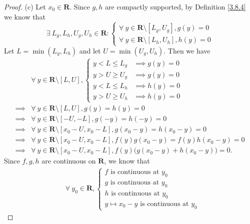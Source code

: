 \begin{proof}{(c)}
    Let \(x_0 \in \mathbf{R}\).
    Since \(g, h\) are compactly supported, by Definition \ref{3.8.4} we know that
    \[
        \exists\ L_g, L_h, U_g, U_h \in \mathbf{R} : \begin{cases}
            \forall\ y \in \mathbf{R} \setminus [L_g, U_g], g(y) = 0 \\
            \forall\ y \in \mathbf{R} \setminus [L_h, U_h], h(y) = 0
        \end{cases}
    \]
    Let \(L = \min(L_g, L_h)\) and let \(U = \min(U_g, U_h)\).
    Then we have
    \begin{align*}
                 & \forall\ y \in \mathbf{R} \setminus [L, U], \begin{cases}
            y < L \leq L_g & \implies g(y) = 0 \\
            y > U \geq U_g & \implies g(y) = 0 \\
            y < L \leq L_h & \implies h(y) = 0 \\
            y > U \geq U_h & \implies h(y) = 0
        \end{cases}                              \\
        \implies & \forall\ y \in \mathbf{R} \setminus [L, U], g(y) = h(y) = 0                                         \\
        \implies & \forall\ y \in \mathbf{R} \setminus [-U, -L], g(-y) = h(-y) = 0                                     \\
        \implies & \forall\ y \in \mathbf{R} \setminus [x_0 - U, x_0 - L], g(x_0 - y) = h(x_0 - y) = 0                 \\
        \implies & \forall\ y \in \mathbf{R} \setminus [x_0 - U, x_0 - L], f(y) g(x_0 - y) = f(y) h(x_0 - y) = 0       \\
        \implies & \forall\ y \in \mathbf{R} \setminus [x_0 - U, x_0 - L], f(y) \big(g(x_0 - y) + h(x_0 - y)\big) = 0.
    \end{align*}
    Since \(f, g, h\) are continuous on \(\mathbf{R}\), we know that
    \begin{align*}
                 & \forall\ y_0 \in \mathbf{R}, \begin{cases}
            f \text{ is continuous at } y_0 \\
            g \text{ is continuous at } y_0 \\
            h \text{ is continuous at } y_0 \\
            y \mapsto x_0 - y \text{ is continuous at } y_0

\end{cases}
\end{align*}
\end{proof}
